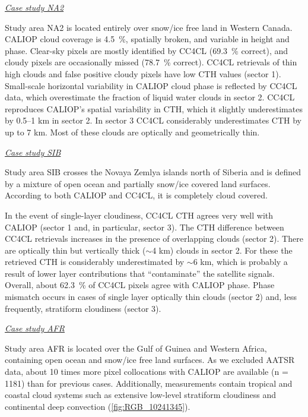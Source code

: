 \vspace{5mm}\underline{\textit{Case study NA2}}\vspace{2mm}

Study area NA2 is located entirely over snow/ice free land in Western Canada. CALIOP cloud coverage is 4.5~\%, spatially broken, and variable in height and phase. Clear-sky pixels are mostly identified by CC4CL (69.3~\% correct), and cloudy pixels are occasionally missed (78.7~\% correct). CC4CL retrievals of thin high clouds and false positive cloudy pixels have low CTH values (sector 1). Small-scale horizontal variability in CALIOP cloud phase is reflected by CC4CL data, which overestimate the fraction of liquid water clouds in sector 2. CC4CL reproduces CALIOP's spatial variability in CTH, which it slightly underestimates by 0.5--1 km in sector 2. In sector 3 CC4CL considerably underestimates CTH by up to 7 km. Most of these clouds are optically and geometrically thin.

\vspace{5mm}\underline{\textit{Case study SIB}}\vspace{2mm}

Study area SIB crosses the Novaya Zemlya islands north of Siberia and is defined by a mixture of open ocean and partially snow/ice covered land surfaces. According to both CALIOP and CC4CL, it is completely cloud covered. 

In the event of single-layer cloudiness, CC4CL CTH agrees very well with CALIOP (sector 1 and, in particular, sector 3). The CTH difference between CC4CL retrievals increases in the presence of overlapping clouds (sector 2). There are optically thin but vertically thick ($\sim$4 km) clouds in sector 2. For these the retrieved CTH is considerably underestimated by $\sim$6 km, which is probably a result of lower layer contributions that ``contaminate'' the satellite signals. Overall, about 62.3~\% of CC4CL pixels agree with CALIOP phase. Phase mismatch occurs in cases of single layer optically thin clouds (sector 2) and, less frequently, stratiform cloudiness (sector 3).

\vspace{5mm}\underline{\textit{Case study AFR}}\vspace{2mm}

Study area AFR is located over the Gulf of Guinea and Western Africa, containing open ocean and snow/ice free land surfaces. As we excluded AATSR data, about 10 times more pixel collocations with CALIOP are available (n = 1181) than for previous cases. Additionally, measurements contain tropical and coastal cloud systems such as extensive low-level stratiform cloudiness and continental deep convection (\cref{fig:RGB_10241345}).

